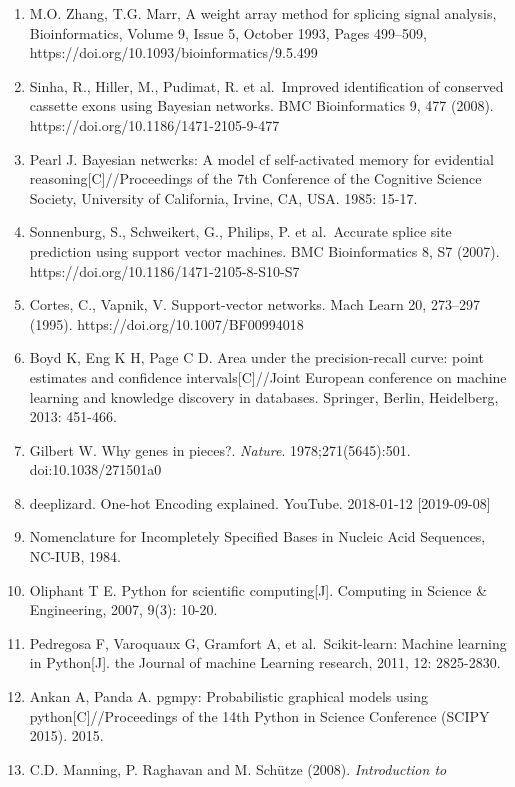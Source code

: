 \documentclass[11pt]{article}
\providecommand{\tightlist}{%
      \setlength{\itemsep}{0pt}\setlength{\parskip}{0pt}}
\begin{document}
\begin{enumerate}
\def\labelenumi{\arabic{enumi}.}
\tightlist
\item
  M.O. Zhang, T.G. Marr, A weight array method for splicing signal
  analysis, Bioinformatics, Volume 9, Issue 5, October 1993, Pages
  499--509, https://doi.org/10.1093/bioinformatics/9.5.499
\item
  Sinha, R., Hiller, M., Pudimat, R. et al.~Improved identification of
  conserved cassette exons using Bayesian networks. BMC Bioinformatics
  9, 477 (2008). https://doi.org/10.1186/1471-2105-9-477
\item
  Pearl J. Bayesian netwcrks: A model cf self-activated memory for
  evidential reasoning{[}C{]}//Proceedings of the 7th Conference of the
  Cognitive Science Society, University of California, Irvine, CA, USA.
  1985: 15-17.
\item
  Sonnenburg, S., Schweikert, G., Philips, P. et al.~Accurate splice
  site prediction using support vector machines. BMC Bioinformatics 8,
  S7 (2007). https://doi.org/10.1186/1471-2105-8-S10-S7
\item
  Cortes, C., Vapnik, V. Support-vector networks. Mach Learn 20,
  273--297 (1995). https://doi.org/10.1007/BF00994018
\item
  Boyd K, Eng K H, Page C D. Area under the precision-recall curve:
  point estimates and confidence intervals{[}C{]}//Joint European
  conference on machine learning and knowledge discovery in databases.
  Springer, Berlin, Heidelberg, 2013: 451-466.
\item
  Gilbert W. Why genes in pieces?. \emph{Nature}. 1978;271(5645):501.
  doi:10.1038/271501a0
\item
  deeplizard. One-hot Encoding explained. YouTube. 2018-01-12
  {[}2019-09-08{]}
\item
  Nomenclature for Incompletely Specified Bases in Nucleic Acid
  Sequences, NC-IUB, 1984.
\item
  Oliphant T E. Python for scientific computing{[}J{]}. Computing in
  Science \& Engineering, 2007, 9(3): 10-20.
\item
  Pedregosa F, Varoquaux G, Gramfort A, et al.~Scikit-learn: Machine
  learning in Python{[}J{]}. the Journal of machine Learning research,
  2011, 12: 2825-2830.
\item
  Ankan A, Panda A. pgmpy: Probabilistic graphical models using
  python{[}C{]}//Proceedings of the 14th Python in Science Conference
  (SCIPY 2015). 2015.
\item
  C.D. Manning, P. Raghavan and M. Schütze (2008). \emph{Introduction to
}
\end{enumerate}
\end{document}
